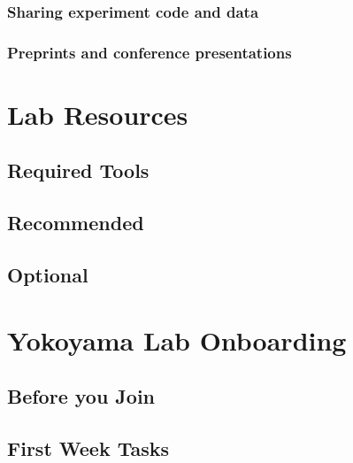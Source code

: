 \documentclass[
]{book}
\begin{document}
\hypertarget{sharing-experiment-code-and-data}{%
\subsection{Sharing experiment code and data}\label{sharing-experiment-code-and-data}}

\hypertarget{preprints-and-conference-presentations}{%
\subsection{Preprints and conference presentations}\label{preprints-and-conference-presentations}}

\hypertarget{lab-resources}{%
\chapter{Lab Resources}\label{lab-resources}}

\hypertarget{required-tools}{%
\section{Required Tools}\label{required-tools}}

\hypertarget{recommended}{%
\section{Recommended}\label{recommended}}

\hypertarget{optional}{%
\section{Optional}\label{optional}}

\hypertarget{getting-started}{%
\chapter{Yokoyama Lab Onboarding}\label{getting-started}}

\hypertarget{before-you-join}{%
\section{Before you Join}\label{before-you-join}}

\hypertarget{first-week-tasks}{%
\section{First Week Tasks}\label{first-week-tasks}}
\end{document}
